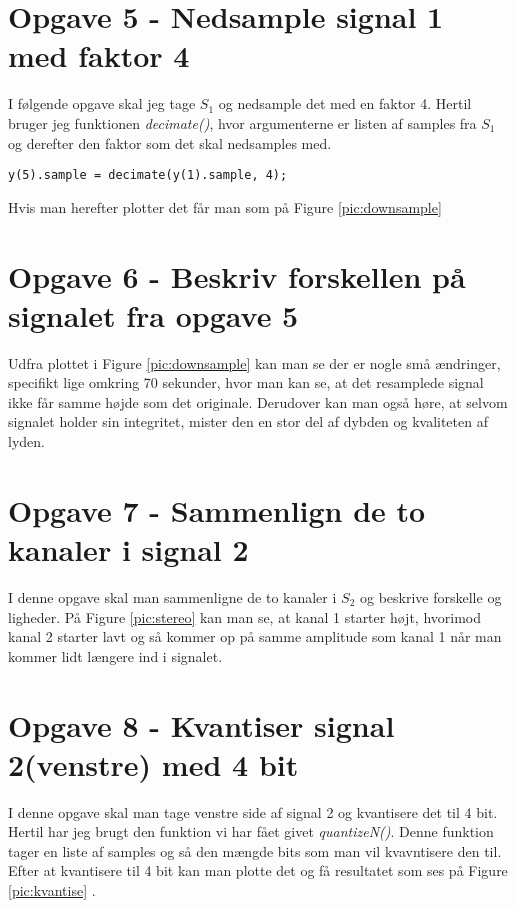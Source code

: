 \documentclass[../main.tex]{subfiles}
\begin{document}
\section{Opgave 5 - Nedsample signal 1 med faktor 4}
I følgende opgave skal jeg tage $S_1$ og nedsample det med en faktor 4. 
Hertil bruger jeg funktionen \textit{decimate()}, hvor argumenterne er listen af samples fra $S_1$ og derefter den faktor som det skal nedsamples med.

\begin{lstlisting}[caption={Nedsampel med faktor 4}, label={lst:downsample}]
y(5).sample = decimate(y(1).sample, 4);
\end{lstlisting}

Hvis man herefter plotter det får man som på Figure \ref{pic:downsample}


\section{Opgave 6 - Beskriv forskellen på signalet fra opgave 5}
Udfra plottet i Figure \ref{pic:downsample} kan man se der er nogle små ændringer, specifikt lige omkring 70 sekunder, hvor man kan se, at det resamplede signal ikke får samme højde som det originale. 
Derudover kan man også høre, at selvom signalet holder sin integritet, mister den en stor del af dybden og kvaliteten af lyden.

\section{Opgave 7 - Sammenlign de to kanaler i signal 2}
I denne opgave skal man sammenligne de to kanaler i $S_2$ og beskrive forskelle og ligheder.
På Figure \ref{pic:stereo} kan man se, at kanal 1 starter højt, hvorimod kanal 2 starter lavt og så kommer op på samme amplitude som kanal 1 når man kommer lidt længere ind i signalet.

\section{Opgave 8 - Kvantiser signal 2(venstre) med 4 bit}
I denne opgave skal man tage venstre side af signal 2 og kvantisere det til 4 bit.
Hertil har jeg brugt den funktion vi har fået givet \textit{quantizeN()}.
Denne funktion tager en liste af samples og så den mængde bits som man vil kvavntisere den til.
Efter at kvantisere til 4 bit kan man plotte det og få resultatet som ses på Figure \ref{pic:kvantise}
.
\end{document}
